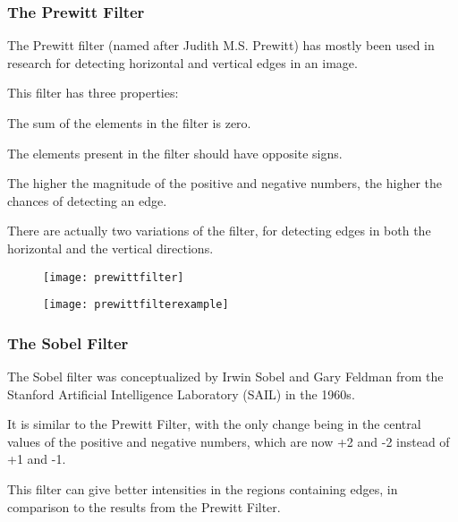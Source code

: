 	\subsubsection{The Prewitt Filter}
	\begin{bulletedlist}
		\item The Prewitt filter (named after Judith M.S. Prewitt) has mostly been used in research for detecting horizontal and vertical edges in an image.
		\item This filter has three properties:
		\begin{bulletedlist}
			\item The sum of the elements in the filter is zero.
			\item The elements present in the filter should have opposite signs.
			\item The higher the magnitude of the positive and negative numbers, the higher the chances of detecting an edge.
		\end{bulletedlist}
		\item There are actually two variations of the filter, for detecting edges in both the horizontal and the vertical
directions.
	\end{bulletedlist}

	\begin{figure}[h]
		\centering
		\texttt{[image: prewittfilter]}
		\caption{}
		\label{fig:prewittfilter}
	\end{figure}
	\begin{figure}[h]
		\centering
		\texttt{[image: prewittfilterexample]}
		\caption{}
		\label{fig:prewittfilterexample}
	\end{figure}

	\subsubsection{The Sobel Filter}
	\begin{bulletedlist}
		\item The Sobel filter was conceptualized by Irwin Sobel and Gary Feldman from the Stanford Artificial Intelligence Laboratory (SAIL) in the 1960s.
		\item It is similar to the Prewitt Filter, with the only change being in the central values of the positive and negative numbers, which are now +2 and -2 instead of +1 and -1.
		\item This filter can give better intensities in the regions containing edges, in comparison to the results from the Prewitt Filter.
	\end{bulletedlist}

